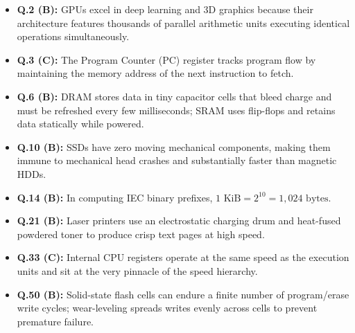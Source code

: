 \begin{expbox}
\begin{itemize}[leftmargin=5mm]
    \item \textbf{Q.2 (B):} GPUs excel in deep learning and 3D graphics because their architecture features thousands of parallel arithmetic units executing identical operations simultaneously.
    \item \textbf{Q.3 (C):} The Program Counter (PC) register tracks program flow by maintaining the memory address of the next instruction to fetch.
    \item \textbf{Q.6 (B):} DRAM stores data in tiny capacitor cells that bleed charge and must be refreshed every few milliseconds; SRAM uses flip-flops and retains data statically while powered.
    \item \textbf{Q.10 (B):} SSDs have zero moving mechanical components, making them immune to mechanical head crashes and substantially faster than magnetic HDDs.
    \item \textbf{Q.14 (B):} In computing IEC binary prefixes, $1\text{ KiB} = 2^{10} = 1,024\text{ bytes}$.
    \item \textbf{Q.21 (B):} Laser printers use an electrostatic charging drum and heat-fused powdered toner to produce crisp text pages at high speed.
    \item \textbf{Q.33 (C):} Internal CPU registers operate at the same speed as the execution units and sit at the very pinnacle of the speed hierarchy.
    \item \textbf{Q.50 (B):} Solid-state flash cells can endure a finite number of program/erase write cycles; wear-leveling spreads writes evenly across cells to prevent premature failure.
\end{itemize}
\end{expbox}

\newpage
